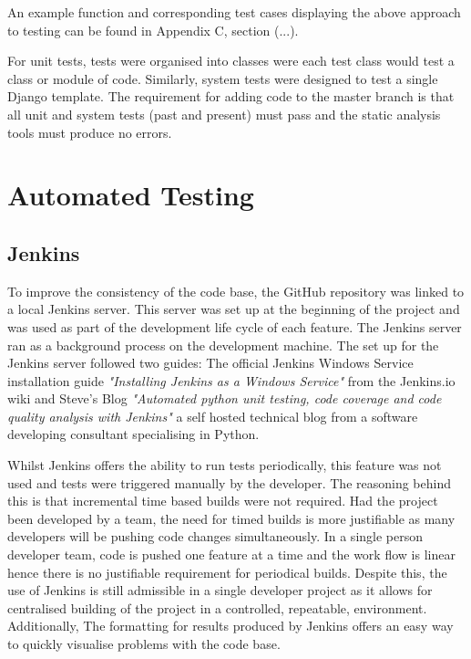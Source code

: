 An example function and corresponding test cases displaying the above approach to testing can be found in Appendix C, section (...).

For unit tests, tests were organised into classes were each test class would test a class or module of code. Similarly, system tests were designed to test a single Django template. The requirement for adding code to the master branch is that all unit and system tests (past and present) must pass and the static analysis tools must produce no errors.

\section{Automated Testing}
\subsection{Jenkins}
To improve the consistency of the code base, the GitHub repository was linked to a local Jenkins server. This server was set up at the beginning of the project and was used as part of the development life cycle of each feature. The Jenkins server ran as a background process on the development machine. The set up for the Jenkins server followed two guides: The official Jenkins Windows Service installation guide \textit{"Installing Jenkins as a Windows Service"} \cite{jenkins_wiki_install} from the Jenkins.io wiki and Steve's Blog \textit{"Automated python unit testing, code coverage and code quality analysis with Jenkins"} \cite{steves_blog} a self hosted technical blog from a software developing consultant specialising in Python.

Whilst Jenkins offers the ability to run tests periodically, this feature was not used and tests were triggered manually by the developer. The reasoning behind this is that incremental time based builds were not required. Had the project been developed by a team, the need for timed builds is more justifiable as many developers will be pushing code changes simultaneously. In a single person developer team, code is pushed one feature at a time and the work flow is linear hence there is no justifiable requirement for periodical builds. Despite this, the use of Jenkins is still admissible in a single developer project as it allows for centralised building of the project in a controlled, repeatable, environment. Additionally, The formatting for results produced by Jenkins offers an easy way to quickly visualise problems with the code base.

